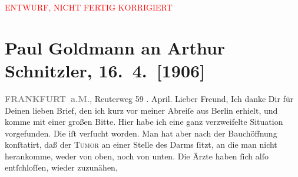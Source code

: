 
\begin{center}
            \textcolor{red}{ENTWURF, NICHT FERTIG KORRIGIERT}
                      \end{center}
            
         
         \renewcommand{\erwaehntePersonen}{Personen: Paul Kraske, Fedor Mamroth, Josef Rosengart, Julius Schnitzler}
         \renewcommand{\erwaehnteOrte}{Orte: Berlin, Frankfurt am Main, Freiburg im Breisgau, Reuterweg, Wien}
         \renewcommand{\erwaehnteWerke}{}
               \section[Paul Goldmann an Arthur Schnitzler, 16. 4. {[}1906{]}]{ Paul Goldmann an Arthur Schnitzler, 16. 4. {[}1906{]}}\nopagebreak{}\rehead{ }\begin{ledgroupsized}[t]{13cm}\normalsize\beginnumbering \toendnotes[C]{\smallbreak\pagebreak[2]} 
\toendnotes[C]{\smallbreak}\pstart
           \noindent{}\raggedleft{}{\pb}\textcolor{gray}{\textbf{FRANKFURT a.M.}}, Reuterweg 59\pend
           . April.\pend
           \pstart
           Lieber Freund, Ich danke Dir für Deinen lieben Brief,
               den ich kurz vor meiner Abreiſe aus Berlin
               erhielt, und komme mit einer großen Bitte.\pend
           \pstart
           Hier habe ich eine ganz
               verzweifelte Situation vorgefunden. Die \label{K-L03243-1v}\label{K-L03243-1h} iſt verſucht
               worden. Man hat aber nach der Bauchöffnung konſtatirt, daß der \textsc{Tumor} an einer Stelle des Darms ſitzt, an die man nicht herankomme, weder
               von oben, noch von unten. Die Ärzte haben ſich alſo entſchloſſen, wieder zuzunähen,

\end{ledgroupsized}
